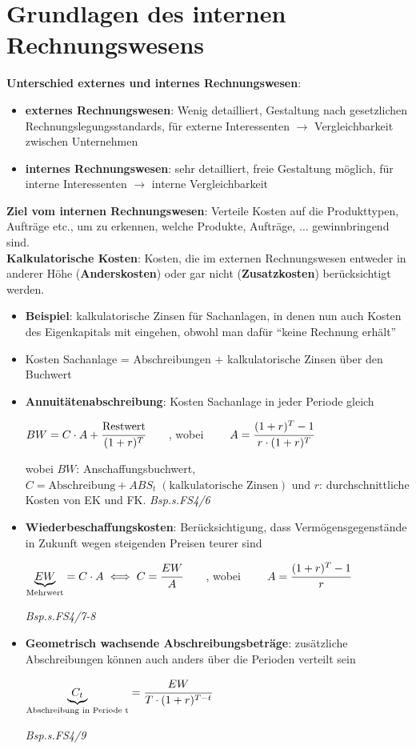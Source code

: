 \section{Grundlagen des internen Rechnungswesens}

\textbf{Unterschied externes und internes Rechnungswesen}:
\begin{itemize}
	\item \textbf{externes Rechnungswesen}: Wenig detailliert, Gestaltung nach gesetzlichen Rechnungslegungsstandards, für externe Interessenten $\rightarrow$ Vergleichbarkeit zwischen Unternehmen
	\item \textbf{internes Rechnungswesen}: sehr detailliert, freie Gestaltung möglich, für interne Interessenten $\rightarrow$ interne Vergleichbarkeit
\end{itemize}

\textbf{Ziel vom internen Rechnungswesen}: Verteile Kosten auf die Produkttypen, Aufträge etc., um zu erkennen, welche Produkte, Aufträge, $\ldots$ gewinnbringend sind.\\

\textbf{Kalkulatorische Kosten}: Kosten, die im externen Rechnungswesen entweder in anderer Höhe (\textbf{Anderskosten}) oder gar nicht (\textbf{Zusatzkosten}) berücksichtigt werden.
\begin{itemize}
	\item \textbf{Beispiel}: kalkulatorische Zinsen für Sachanlagen, in denen nun auch Kosten des Eigenkapitals mit eingehen, obwohl man dafür \enquote{keine Rechnung erhält}
	\item Kosten Sachanlage = Abschreibungen + kalkulatorische Zinsen über den Buchwert
	\item \textbf{Annuitätenabschreibung}: Kosten Sachanlage in jeder Periode gleich
	\begin{tightcenter}
		$BW=C\cdot A+\cfrac{\text{Restwert}}{(1+r)^T}\qquad$, wobei $\qquad A=\cfrac{(1+r)^T-1}{r\cdot (1+r)^T}$
	\end{tightcenter}
	wobei $BW$: Anschaffungsbuchwert, $C=\text{Abschreibung}+ABS_t\;(\text{kalkulatorische Zinsen})$ und $r$: durchschnittliche Kosten von EK und FK. \textit{Bsp.s.FS4/6}
	\item \textbf{Wiederbeschaffungskosten}: Berücksichtigung, dass Vermögensgegenstände in Zukunft wegen steigenden Preisen teurer sind
	\begin{tightcenter}
		$\underbrace{EW}_\text{Mehrwert}=C\cdot A \iff C=\cfrac{EW}{A}\qquad$, wobei $\qquad A=\cfrac{(1+r)^T-1}{r}$
	\end{tightcenter}
	\textit{Bsp.s.FS4/7-8}
	\item \textbf{Geometrisch wachsende Abschreibungsbeträge}: zusätzliche Abschreibungen können auch anders über die Perioden verteilt sein
	\begin{tightcenter}
		$\underbrace{C_t}_\text{Abschreibung in Periode t}=\cfrac{EW}{T\cdot (1+r)^{T-t}}$
	\end{tightcenter}
	\textit{Bsp.s.FS4/9}
\end{itemize}
\bigskip

